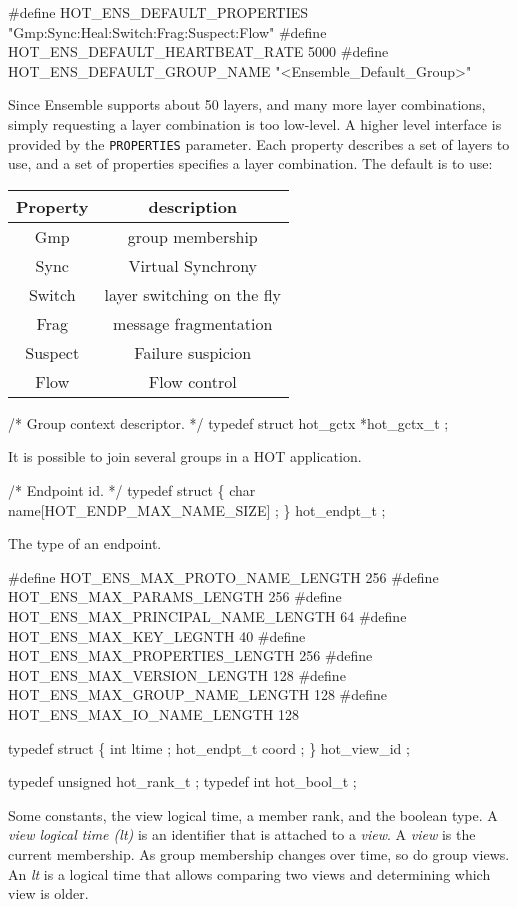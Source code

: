 \begin{codebox}
#define HOT_ENS_DEFAULT_PROPERTIES "Gmp:Sync:Heal:Switch:Frag:Suspect:Flow"
#define HOT_ENS_DEFAULT_HEARTBEAT_RATE 5000
#define HOT_ENS_DEFAULT_GROUP_NAME "<Ensemble_Default_Group>"
\end{codebox}
Since Ensemble supports about 50 layers, and many more layer
combinations, simply requesting a layer combination is too
low-level. A higher level interface is provided by the {\tt PROPERTIES}
parameter. Each property describes a set of layers to use, and a set
of properties specifies a layer combination. The default is to use: \newline
\vspace{1mm}

\begin{tabular}{|c|c|} \hline
Property & description \\ \hline
Gmp & group membership \\
Sync & Virtual Synchrony \\
Switch & layer switching on the fly \\
Frag & message fragmentation  \\
Suspect & Failure suspicion \\ 
Flow & Flow control \\ \hline
\end{tabular}

\begin{codebox}
/* Group context descriptor.
 */
typedef struct hot_gctx *hot_gctx_t ;
\end{codebox}
It is possible to join several groups in a HOT application.

\begin{codebox}
/* Endpoint id.
 */
typedef struct \{ 
  char name[HOT_ENDP_MAX_NAME_SIZE] ; 
\} hot_endpt_t ;
\end{codebox}
The type of an endpoint.

\begin{codebox}
#define HOT_ENS_MAX_PROTO_NAME_LENGTH 256
#define HOT_ENS_MAX_PARAMS_LENGTH 256
#define HOT_ENS_MAX_PRINCIPAL_NAME_LENGTH 64
#define HOT_ENS_MAX_KEY_LEGNTH     40
#define HOT_ENS_MAX_PROPERTIES_LENGTH 256
#define HOT_ENS_MAX_VERSION_LENGTH 128
#define HOT_ENS_MAX_GROUP_NAME_LENGTH 128
#define HOT_ENS_MAX_IO_NAME_LENGTH 128

typedef struct \{
  int ltime ;
  hot_endpt_t coord ;
\} hot_view_id ;

typedef unsigned hot_rank_t ;
typedef int hot_bool_t ;
\end{codebox}
Some constants, the view logical time, a member rank, and the boolean
type. A {\it view logical time (lt)} is an identifier that is attached to a
{\it view}. A {\it view} is the current membership. As group
membership changes over time, so do group views. An {\it lt} is a logical
time that allows comparing two views and determining which view is
older. 



